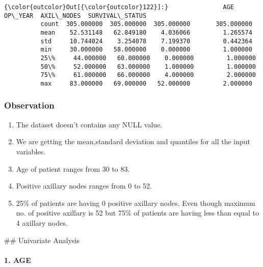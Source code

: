 \documentclass[11pt]{article}
\providecommand{\tightlist}{%
      \setlength{\itemsep}{0pt}\setlength{\parskip}{0pt}}
\begin{document}
\begin{Verbatim}[commandchars=\\\{\}]
{\color{outcolor}Out[{\color{outcolor}122}]:}               AGE     OP\_YEAR  AXIL\_NODES  SURVIVAL\_STATUS
          count  305.000000  305.000000  305.000000       305.000000
          mean    52.531148   62.849180    4.036066         1.265574
          std     10.744024    3.254078    7.199370         0.442364
          min     30.000000   58.000000    0.000000         1.000000
          25\%     44.000000   60.000000    0.000000         1.000000
          50\%     52.000000   63.000000    1.000000         1.000000
          75\%     61.000000   66.000000    4.000000         2.000000
          max     83.000000   69.000000   52.000000         2.000000
\end{Verbatim}
            
    \subsubsection{Observation}\label{observation}

\begin{enumerate}
\def\labelenumi{\arabic{enumi}.}
\tightlist
\item
  The dataset doesn't contains any NULL value.
\item
  We are getting the mean,standard deviation and quantiles for all the
  input variables.
\item
  Age of patient ranges from 30 to 83.
\item
  Positive axillary nodes ranges from 0 to 52.
\item
  25\% of patients are having 0 positive axillary nodes. Even though
  maximum no. of positive axillary is 52 but 75\% of patients are having
  less than equal to 4 axillary nodes.
\end{enumerate}

    \#\# Univariate Analysis

    \paragraph{1. AGE}\label{age}
\end{document}
